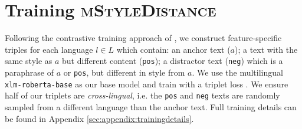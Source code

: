\section{Training \textsc{mStyleDistance}}
\label{sec:styledistance}

Following the contrastive training approach of \citet{patel2024styledistancestrongercontentindependentstyle}, we construct feature-specific triples for each language $l \in L$ which contain: an anchor text ($a$); a text with the same style as $a$ but different content ({\tt pos}); a distractor text ({\tt neg}) which is a paraphrase of $a$ or {\tt pos}, but different in style from $a$. We use the multilingual \texttt{xlm-roberta-base} as our base model and train with a triplet loss \citep{Conneau2019UnsupervisedCR,tripletloss}. We ensure half of our triplets are \textit{cross-lingual}, i.e. the {\tt pos} and {\tt neg} texts are randomly sampled from a different language than the anchor text. Full training details can be found in Appendix \ref{sec:appendix:trainingdetails}.